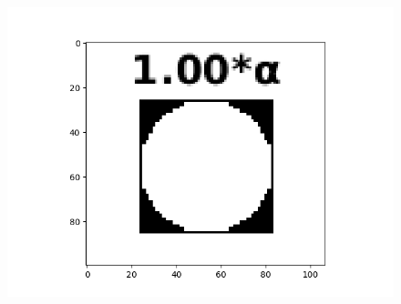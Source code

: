 \documentclass[12pt, a4paper]{article}
\begin{document}
\begin{figure}[h!]
\begin{minipage}[c][1\width]{0.19\textwidth}
	    \label{fig:3.4(a)}
    \end{minipage}
    \begin{minipage}[c][1\width]{0.19\textwidth}
        \hspace*{-14pt}
    	\includegraphics[width=1.24\textwidth]{flower_kernel_1.00_cropped.png}
	    \label{fig:3.4(a)}
    \end{minipage}
\end{figure}
\end{document}
